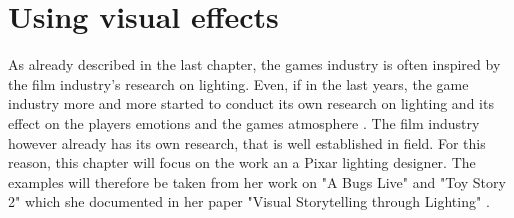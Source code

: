 \chapter{Using visual effects}

As already described in the last chapter, the games industry is often inspired by the film industry's research on lighting. Even, if in the last years, the game industry more and more started to conduct its own research on lighting and its effect on the players emotions and the games atmosphere \cite{Niedenthal1404353}. The film industry however already has its own research, that is well established in field. For this reason, this chapter will focus on the work an a Pixar lighting designer. The examples will therefore be taken from her work on "A Bugs Live" and "Toy Story 2" which she documented in her paper "Visual Storytelling through Lighting" \cite{sudeep}.

